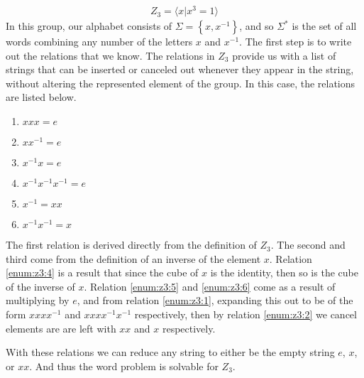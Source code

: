 \documentclass[10pt]{amsart}
\theoremstyle{definition}
\theoremstyle{remark}
\begin{document}
\begin{align}
  Z_3=\langle x \vert x^3=1 \rangle
\end{align}
In this group, our alphabet consists of $\Sigma=\left\{x,x^{-1}\right\}$, and
so $\Sigma^*$ is the set of all words combining any number of the letters $x$
and $x^{-1}$. The first step is to write out the relations that we know. The
relations in $Z_3$ provide us with a list of strings that can be inserted or
canceled out whenever they appear in the string, without altering the
represented element of the group. In this case, the relations are listed below.
\begin{multicols}{2}
  \begin{enumerate}
    \item $xxx= e$\label{enum:z3:1}
    \item $xx^{-1}= e$\label{enum:z3:2}
    \item $x^{-1}x= e$\label{enum:z3:3}
    \item $x^{-1}x^{-1}x^{-1}= e$\label{enum:z3:4}
    \item $x^{-1}= xx$\label{enum:z3:5}
    \item $x^{-1}x^{-1}= x$\label{enum:z3:6}
  \end{enumerate}
\end{multicols}
The first relation is derived directly from the definition of $Z_3$. The second
and third come from the definition of an inverse of the element $x$. Relation
\ref{enum:z3:4} is a result that since the cube of $x$ is the identity, then so
is the cube of the inverse of $x$. Relation \ref{enum:z3:5} and \ref{enum:z3:6}
come as a result of multiplying by $e$, and from relation \ref{enum:z3:1},
expanding this out to be of the form $xxxx^{-1}$ and $xxxx^{-1}x^{-1}$
respectively, then by relation \ref{enum:z3:2} we cancel elements are are left
with $xx$ and $x$ respectively.

With these relations we can reduce any string to either be the empty string
$e$, $x$, or $xx$. And thus the word problem is solvable for $Z_3$. 
\end{document}
